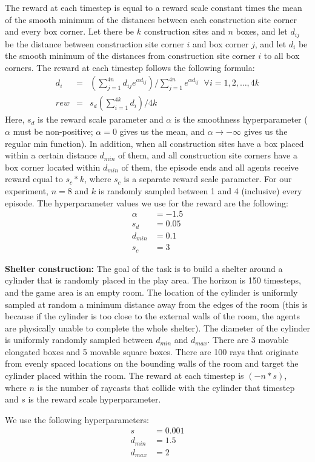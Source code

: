 The reward at each timestep is equal to a reward scale constant times the mean of the smooth minimum of the distances between each construction site corner and every box corner. Let there be $k$ construction sites and $n$ boxes, and let $d_{ij}$ be the distance between construction site corner $i$ and box corner $j$, and let $d_i$ be the smooth minimum of the distances from construction site corner $i$ to all box corners. The reward at each timestep follows the following formula:
\begin{eqnarray*}
    d_i &=& \left(\sum_{j=1}^{4n} d_{ij} e^{\alpha d_{ij}}\right) / \sum_{j=1}^{4n}  e^{\alpha d_{ij}} \;\; \forall i = 1,2, \dots, 4k\\
    rew &=& s_d \left(\sum_{i=1}^{4k} d_i\right) / 4k
\end{eqnarray*}
Here, $s_d$ is the reward scale parameter and $\alpha$ is the smoothness hyperparameter ($\alpha$ must be non-positive; $\alpha = 0$ gives us the mean, and $\alpha \rightarrow -\infty$ gives us the regular min function). In addition, when all construction sites have a box placed within a certain distance $d_{min}$ of them, and all construction site corners have a box corner located within $d_{min}$ of them, the episode ends and all agents receive reward equal to $s_c * k$, where $s_c$ is a separate reward scale parameter.
For our experiment, $n=8$ and $k$ is randomly sampled between 1 and 4 (inclusive) every episode. The hyperparameter values we use for the reward are the following:
\begin{align*}
    \alpha &= -1.5 \\
    s_d &= 0.05 \\
    d_{min} &= 0.1 \\
    s_c &= 3
\end{align*}


\textbf{Shelter construction:}
The goal of the task is to build a shelter around a cylinder that is randomly placed in the play area.
The horizon is 150 timesteps, and the game area is an empty room. The location of the cylinder is uniformly sampled at random a minimum distance away from the edges of the room (this is because if the cylinder is too close to the external walls of the room, the agents are physically unable to complete the whole shelter). The diameter of the cylinder is uniformly randomly sampled between $d_{min}$ and $d_{max}$. There are 3 movable elongated boxes and 5 movable square boxes. There are 100 rays that originate from evenly spaced locations on the bounding walls of the room and target the cylinder placed within the room. The reward at each timestep is $(-n * s)$, where $n$ is the number of raycasts that collide with the cylinder that timestep and $s$ is the reward scale hyperparameter.

We use the following hyperparameters:
\begin{align*}
    s &= 0.001 \\
    d_{min} &= 1.5 \\
    d_{max} &= 2
\end{align*}